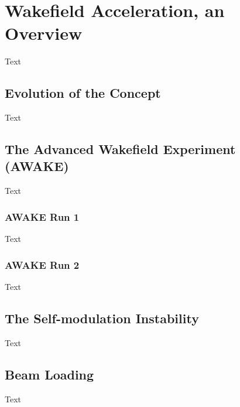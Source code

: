 %
%

\chapter{Wakefield Acceleration, an Overview}
\label{Ch:WFA}

Text

\section{Evolution of the Concept}
\label{WFA:History}

Text

\section{The Advanced Wakefield Experiment (AWAKE)}
\label{WFA:AWAKE}

Text

\subsection{AWAKE Run 1}
\label{WFA:AWAKE:R1}

Text

\subsection{AWAKE Run 2}
\label{WFA:AWAKE:R2}

Text

\section{The Self-modulation Instability}
\label{WFA:SMI}

Text

\section{Beam Loading}
\label{WFA:BLoad}

Text

